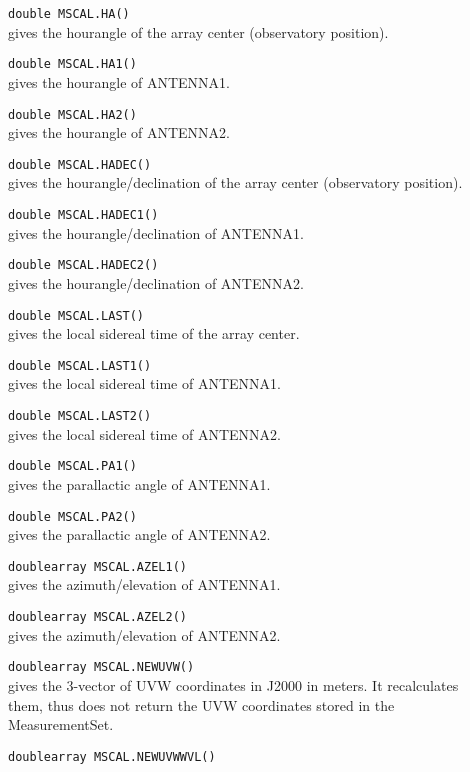 \begin{description}
  \item[] \texttt{double MSCAL.HA()}\\
    gives the hourangle of the array center (observatory position).
  \item[] \texttt{double MSCAL.HA1()}\\
    gives the hourangle of ANTENNA1.
  \item[] \texttt{double MSCAL.HA2()}\\
    gives the hourangle of ANTENNA2.
  \item[] \texttt{double MSCAL.HADEC()}\\
    gives the hourangle/declination of the array center (observatory position).
  \item[] \texttt{double MSCAL.HADEC1()}\\
    gives the hourangle/declination of ANTENNA1.
  \item[] \texttt{double MSCAL.HADEC2()}\\
    gives the hourangle/declination of ANTENNA2.
  \item[] \texttt{double MSCAL.LAST()}\\
    gives the local sidereal time of the array center.
  \item[] \texttt{double MSCAL.LAST1()}\\
    gives the local sidereal time of ANTENNA1.
  \item[] \texttt{double MSCAL.LAST2()}\\
    gives the local sidereal time of ANTENNA2.
  \item[] \texttt{double MSCAL.PA1()}\\
    gives the parallactic angle of ANTENNA1.
  \item[] \texttt{double MSCAL.PA2()}\\
    gives the parallactic angle of ANTENNA2.
  \item[] \texttt{doublearray MSCAL.AZEL1()}\\
    gives the azimuth/elevation of ANTENNA1.
  \item[] \texttt{doublearray MSCAL.AZEL2()}\\
    gives the azimuth/elevation of ANTENNA2.
  \item[] \texttt{doublearray MSCAL.NEWUVW()}\\
    gives the 3-vector of UVW coordinates in J2000 in meters. It recalculates
    them, thus does not return the UVW coordinates stored in the MeasurementSet.
  \item[] \texttt{doublearray MSCAL.NEWUVWWVL()}\\

\end{description}
